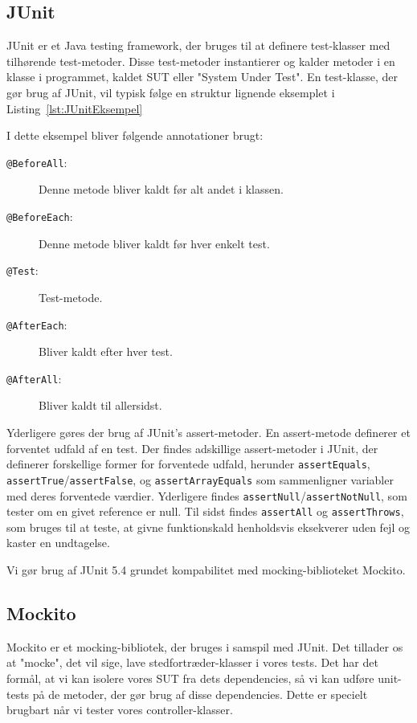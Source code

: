 \subsection{JUnit}
JUnit er et Java testing framework, der bruges til at definere test-klasser med tilhørende test-metoder. Disse test-metoder instantierer og kalder metoder i en klasse i programmet, kaldet SUT eller "System Under Test". En test-klasse, der gør brug af JUnit, vil typisk følge en struktur lignende eksemplet i Listing~\ref{lst:JUnitEksempel}

I dette eksempel bliver følgende annotationer brugt\cite{JUnitDocumentation}: 
\begin{description}
    \item[\texttt{@BeforeAll}:] Denne metode bliver kaldt før alt andet i klassen.
    \item[\texttt{@BeforeEach}:] Denne metode bliver kaldt før hver enkelt test.
    \item[\texttt{@Test}:] Test-metode.
    \item[\texttt{@AfterEach}:] Bliver kaldt efter hver test.
    \item[\texttt{@AfterAll}:] Bliver kaldt til allersidst.      
\end{description}

Yderligere gøres der brug af JUnit's assert-metoder. En assert-metode definerer et forventet udfald af en test. Der findes adskillige assert-metoder i JUnit, der definerer forskellige former for forventede udfald, herunder \texttt{assertEquals}, \texttt{assertTrue}/\texttt{assertFalse}, og \texttt{assertArrayEquals} som sammenligner variabler med deres forventede værdier. Yderligere findes \texttt{assertNull}/\texttt{assertNotNull}, som tester om en givet reference er null. Til sidst findes \texttt{assertAll} og \texttt{assertThrows}, som bruges til at teste, at givne funktionskald henholdsvis eksekverer uden fejl og kaster en undtagelse\cite{JUnitDocumentation}.

Vi gør brug af JUnit 5.4 grundet kompabilitet med mocking-biblioteket Mockito.


\subsection{Mockito}
Mockito er et mocking-bibliotek, der bruges i samspil med JUnit. Det tillader os at "mocke", det vil sige, lave stedfortræder-klasser i vores tests. Det har det formål, at vi kan isolere vores SUT fra dets dependencies, så vi kan udføre unit-tests på de metoder, der gør brug af disse dependencies. Dette er specielt brugbart når vi tester vores controller-klasser.

